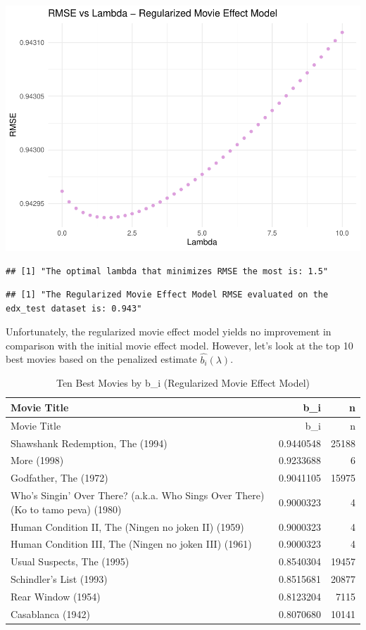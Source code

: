 \documentclass[
]{article}
\begin{document}
\begin{center}\includegraphics{MovieLens-Report_MitjaPrah_files/figure-latex/unnamed-chunk-43-1} \end{center}

\begin{verbatim}
## [1] "The optimal lambda that minimizes RMSE the most is: 1.5"
\end{verbatim}

\begin{verbatim}
## [1] "The Regularized Movie Effect Model RMSE evaluated on the edx_test dataset is: 0.943"
\end{verbatim}

Unfortunately, the regularized movie effect model yields no improvement
in comparison with the initial movie effect model. However, let's look
at the top 10 best movies based on the penalized estimate
\(\hat{b_{i}} (\lambda)\).

\begin{longtable}[]{@{}lrr@{}}
\caption{Ten Best Movies by b\_i (Regularized Movie Effect
Model)}\tabularnewline
\toprule
Movie Title & b\_i & n\tabularnewline
\midrule
\endfirsthead
\toprule
Movie Title & b\_i & n\tabularnewline
\midrule
\endhead
Shawshank Redemption, The (1994) & 0.9440548 & 25188\tabularnewline
More (1998) & 0.9233688 & 6\tabularnewline
Godfather, The (1972) & 0.9041105 & 15975\tabularnewline
Who's Singin' Over There? (a.k.a. Who Sings Over There) (Ko to tamo
peva) (1980) & 0.9000323 & 4\tabularnewline
Human Condition II, The (Ningen no joken II) (1959) & 0.9000323 &
4\tabularnewline
Human Condition III, The (Ningen no joken III) (1961) & 0.9000323 &
4\tabularnewline
Usual Suspects, The (1995) & 0.8540304 & 19457\tabularnewline
Schindler's List (1993) & 0.8515681 & 20877\tabularnewline
Rear Window (1954) & 0.8123204 & 7115\tabularnewline
Casablanca (1942) & 0.8070680 & 10141\tabularnewline
\bottomrule
\end{longtable}
\end{document}
